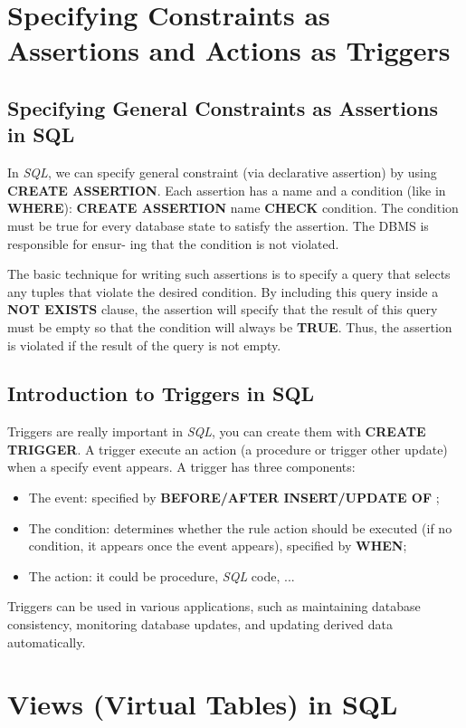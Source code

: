 \section{Specifying Constraints as Assertions and Actions as Triggers}
\subsection{Specifying General Constraints as Assertions in SQL}
In \textit{SQL}, we can specify general constraint (via declarative assertion) by using \textbf{CREATE ASSERTION}. Each assertion has a name and a condition (like in \textbf{WHERE}): \textbf{CREATE ASSERTION} name \textbf{CHECK} condition. The condition must be true for every database state to satisfy the assertion. The DBMS is responsible for ensur- ing that the condition is not violated.

The basic technique for writing such assertions is to specify a query that selects any tuples that violate the desired condition. By including this query inside a \textbf{NOT EXISTS} clause, the assertion will specify that the result of this query must be empty so that the condition will always be \textbf{TRUE}. Thus, the assertion is violated if the result of the query is not empty. 
\subsection{Introduction to Triggers in SQL}
Triggers are really important in \textit{SQL}, you can create them with \textbf{CREATE TRIGGER}. A trigger execute an action (a procedure or trigger other update) when a specify event appears. A trigger has three components:
\begin{itemize}
\item The event: specified by \textbf{BEFORE/AFTER INSERT/UPDATE OF };
\item The condition: determines whether the rule action should be executed (if no condition, it appears once the event appears), specified by \textbf{WHEN};
\item The action: it could be procedure, \textit{SQL} code, ...
\end{itemize}
Triggers can be used in various applications, such as maintaining database consistency, monitoring database updates, and updating derived data automatically.

\section{Views (Virtual Tables) in SQL}
